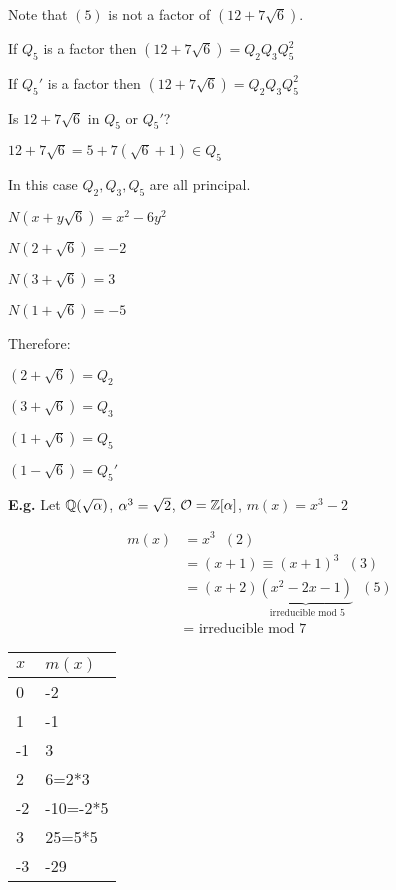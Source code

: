 \documentclass[11pt]{article}
\begin{document}
Note that $(5)$ is not a factor of $(12 + 7 \sqrt6)$.

\spa


If $Q_5$ is a factor then $(12 + 7\sqrt6) = Q_2Q_3Q_5^2$

If $Q_5'$ is a factor then $(12 + 7\sqrt6) = Q_2Q_3Q_5^2$
\spa

Is $12 + 7\sqrt6 $ in $Q_5$ or $Q_5'$?
\spa

$12+7\sqrt6 = 5 + 7(\sqrt6 + 1) \in Q_5$
 \spa

 In this case $Q_2, Q_3, Q_5$ are all principal.
 \spa

 $N(x+y\sqrt6) = x^2 - 6y^2$
 \spa


 $N(2+ \sqrt6)  = - 2$

 
 $N(3+ \sqrt6)  = 3$
 
 
 $N(1+ \sqrt6)  = - 5$
\spa

 Therefore:

 
 $(2 + \sqrt6 ) = Q_2$
 
 $(3 + \sqrt6 ) = Q_3$ 

 $(1+ \sqrt6 ) = Q_5$
 
 $(1 - \sqrt6 ) = Q_5'$

\spac 
\textbf{E.g.} Let $ \mathbb{Q}(\sqrt{\alpha})$,  $\alpha^3 =\sqrt2$, $\mathcal{O} =  \mathbb{Z}[\alpha]$, $m(x) = x^3 - 2$



\begin{align*}
	m(x) & = x^3 \hspace{7pt} (2)\\
	& = (x+1) \equiv (x+1)^3 \hspace{7pt} (3)\\
	& = (x+2) \underbrace{(x^2-2x-1)}_\text{ irreducible mod 5} \hspace{7pt} (5)\\
	& = \text{ irreducible mod 7}
\end{align*}
 
 

\begin{tabular}{l|l}
	$x$ & $m(x)$   \\
	\hline
	0   & -2       \\
	1   & -1       \\
	-1  & 3        \\
	2   & 6=2*3    \\
	-2  & -10=-2*5 \\
	3   & 25=5*5   \\
	-3  & -29     
\end{tabular}
 
\spa
\end{document}
